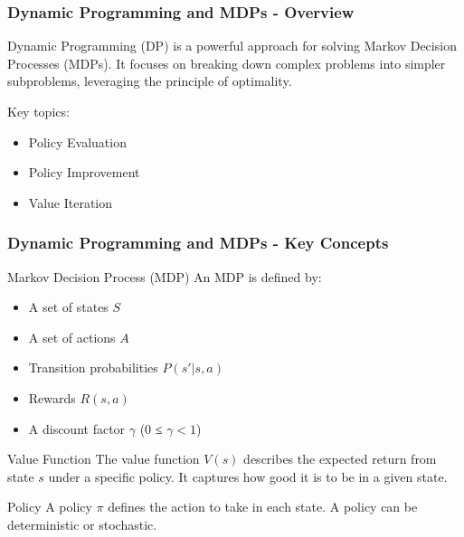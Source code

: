 \documentclass{beamer}
\begin{document}
\begin{frame}[fragile]
    \frametitle{Dynamic Programming and MDPs - Overview}
    Dynamic Programming (DP) is a powerful approach for solving Markov Decision Processes (MDPs). It focuses on breaking down complex problems into simpler subproblems, leveraging the principle of optimality.
    
    Key topics:
    \begin{itemize}
        \item Policy Evaluation
        \item Policy Improvement
        \item Value Iteration
    \end{itemize}
\end{frame}

\begin{frame}[fragile]
    \frametitle{Dynamic Programming and MDPs - Key Concepts}
    \begin{block}{Markov Decision Process (MDP)}
        An MDP is defined by:
        \begin{itemize}
            \item A set of states \( S \)
            \item A set of actions \( A \)
            \item Transition probabilities \( P(s' | s, a) \)
            \item Rewards \( R(s, a) \)
            \item A discount factor \( \gamma \) (0 ≤ \( \gamma < 1 \))
        \end{itemize}
    \end{block}
    
    \begin{block}{Value Function}
        The value function \( V(s) \) describes the expected return from state \( s \) under a specific policy. It captures how good it is to be in a given state.
    \end{block}

    \begin{block}{Policy}
        A policy \( \pi \) defines the action to take in each state. A policy can be deterministic or stochastic.
    \end{block}
\end{frame}
\end{document}
